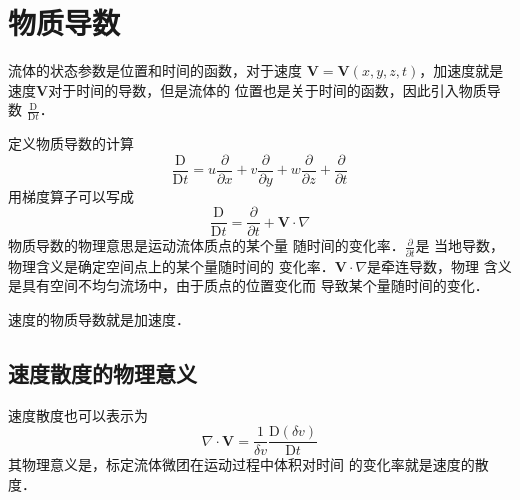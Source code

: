 \section{物质导数}
流体的状态参数是位置和时间的函数，对于速度
$\mathbf{V}=\mathbf{V}(x,y,z,t)$，加速度就是
速度$\mathbf{V}$对于时间的导数，但是流体的
位置也是关于时间的函数，因此引入物质导数
$\frac{\mathrm{D}}{\mathrm{D}t }$．

定义物质导数的计算
\[
  \frac{\mathrm{D}}{\mathrm{D}t }=u \frac{\partial }
  {\partial x}+v \frac{\partial }{\partial y }+
  w \frac{\partial }{\partial z}+
  \frac{\partial }{\partial t }
\]
用梯度算子可以写成
\[
  \frac{\mathrm{D}}{\mathrm{D}t }=
  \frac{\partial }{\partial t }+
  \mathbf{V} \cdot \nabla 
\]
物质导数的物理意思是运动流体质点的某个量
随时间的变化率．$\frac{\partial }{\partial t }$是
当地导数，物理含义是确定空间点上的某个量随时间的
变化率．$\mathbf{V}\cdot\nabla$是牵连导数，物理
含义是具有空间不均匀流场中，由于质点的位置变化而
导致某个量随时间的变化．

速度的物质导数就是加速度．

\subsection{速度散度的物理意义}
速度散度也可以表示为
\[
  \nabla \cdot \mathbf{V}=\frac{1}{\delta v }
  \frac{\mathrm{D}(\delta v )}{\mathrm{D}t }
\]
其物理意义是，标定流体微团在运动过程中体积对时间
的变化率就是速度的散度．



